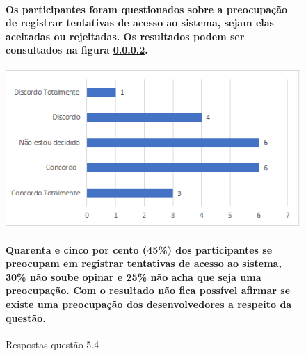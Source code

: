 \begin{figure}[!t]
\centering
\paragraph{Os participantes foram questionados sobre a preocupação de registrar tentativas de acesso ao sistema, sejam elas aceitadas ou rejeitadas. Os resultados podem ser consultados na figura \ref{fig:5.4}.}
\includegraphics[scale=0.7]{figuras das questoes/5.4.png}
\caption{Respostas questão 5.4}
\paragraph{Quarenta e cinco por cento (45{\%}) dos participantes se preocupam em registrar tentativas de acesso ao sistema, 30{\%} não soube opinar e 25{\%} não acha que seja uma preocupação. Com o resultado não fica possível afirmar se existe uma preocupação dos desenvolvedores a respeito da questão.}
\label{fig:5.4}
\end{figure}
